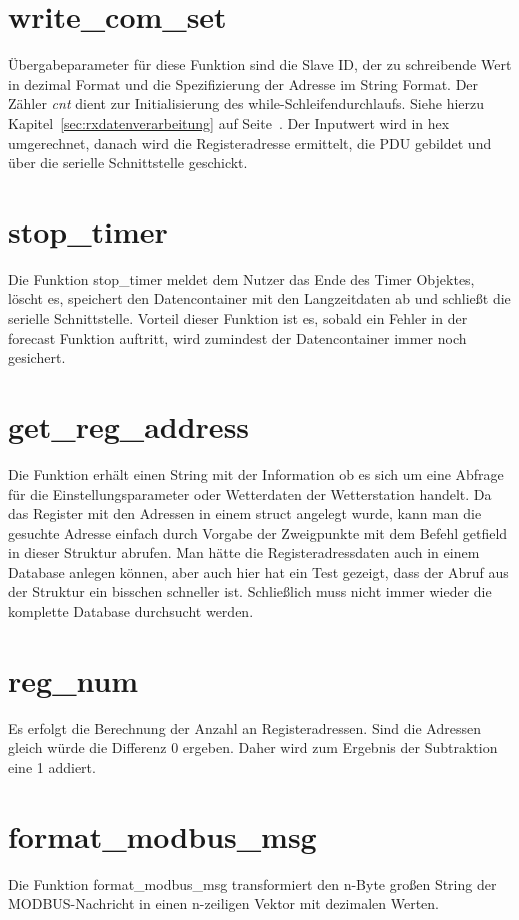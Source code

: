 \section{write\_com\_set}\label{sec:writecomset}
Übergabeparameter für diese Funktion sind die Slave ID, der zu schreibende Wert in dezimal Format und die Spezifizierung der Adresse im String Format. Der Zähler \textit{cnt} dient zur Initialisierung des while-Schleifendurchlaufs. Siehe hierzu Kapitel~\ref{sec:rxdatenverarbeitung} auf Seite~\pageref{sec:rxdatenverarbeitung}.
Der Inputwert wird in hex umgerechnet, danach wird die Registeradresse ermittelt, die PDU gebildet und über die serielle Schnittstelle geschickt.

\section{stop\_timer}\label{sec:stoptimer}
Die Funktion \textsf{stop\_timer} meldet dem Nutzer das Ende des Timer Objektes, löscht es, speichert den Datencontainer mit den Langzeitdaten ab und schließt die serielle Schnittstelle. Vorteil dieser Funktion ist es, sobald ein Fehler in der forecast Funktion auftritt, wird zumindest der Datencontainer immer noch gesichert.

\section{get\_reg\_address}\label{sec:getregadd}
Die Funktion erhält einen String mit der Information ob es sich um eine Abfrage für die Einstellungsparameter oder Wetterdaten der Wetterstation handelt. Da das Register mit den Adressen in einem struct angelegt wurde, kann man die gesuchte Adresse einfach durch Vorgabe der Zweigpunkte mit dem Befehl \textsf{getfield} in dieser Struktur abrufen. Man hätte die Registeradressdaten auch in einem Database anlegen können, aber auch hier hat ein Test gezeigt, dass der Abruf aus der Struktur ein bisschen schneller ist. Schließlich muss nicht immer wieder die komplette Database durchsucht werden. 

\section{reg\_num}\label{sec:regnum}
Es erfolgt die Berechnung der Anzahl an Registeradressen. Sind die Adressen gleich würde die Differenz 0 ergeben. Daher wird zum Ergebnis der Subtraktion eine 1 addiert.

\section{format\_modbus\_msg}\label{sec:formatmodbusmsg}
Die Funktion \textsf{format\_modbus\_msg} transformiert den n-Byte großen String der MODBUS-Nachricht in einen n-zeiligen Vektor mit dezimalen Werten.

